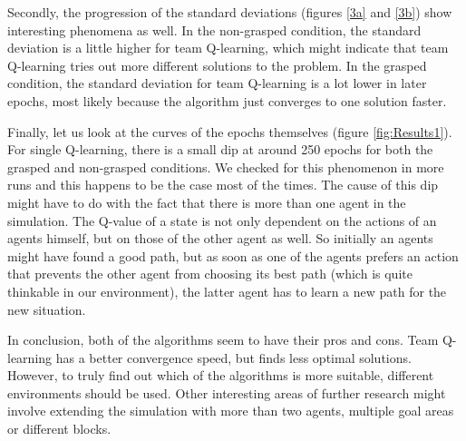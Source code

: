 Secondly, the progression of the standard deviations (figures \ref{3a} and \ref{3b}) show interesting phenomena as well. In the non-grasped condition, the standard deviation is a little higher for team Q-learning, which might indicate that team Q-learning tries out more different solutions to the problem. In the grasped condition, the standard deviation for team Q-learning is a lot lower in later epochs, most likely because the algorithm just converges to one solution faster.

Finally, let us look at the curves of the epochs themselves (figure \ref{fig:Results1}). For single Q-learning, there is a small dip at around 250 epochs for both the grasped and non-grasped conditions. We checked for this phenomenon in more runs and this happens to be the case most of the times. The cause of this dip might have to do with the fact that there is more than one agent in the simulation. The Q-value of a state is not only dependent on the actions of an agents himself, but on those of the other agent as well. So initially an agents might have found a good path, but as soon as one of the agents prefers an action that prevents the other agent from choosing its best path (which is quite thinkable in our environment), the latter agent has to learn a new path for the new situation. 

In conclusion, both of the algorithms seem to have their pros and cons. Team Q-learning has a better convergence speed, but finds less optimal solutions. However, to truly find out which of the algorithms is more suitable, different environments should be used. Other interesting areas of further research might involve extending the simulation with more than two agents, multiple goal areas or different blocks.